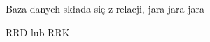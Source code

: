 \documentclass{article}
\begin{document}
\begin{solution}
%
\end{solution}

\begin{problem}
  Baza danych składa się z relacji, jara jara jara

  RRD lub RRK
\end{problem}
\end{document}
